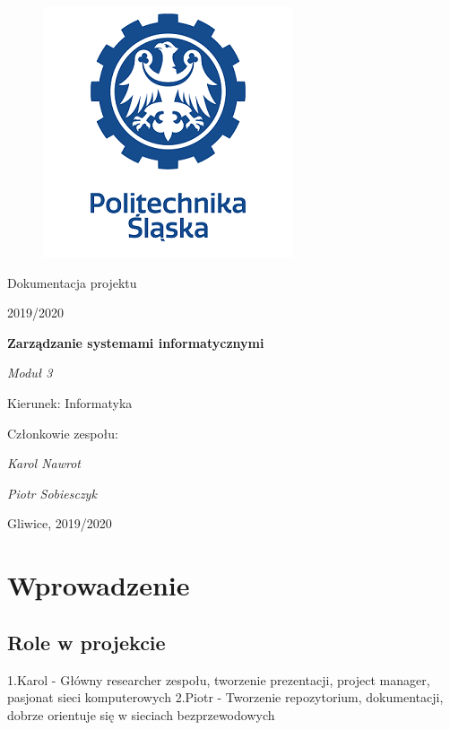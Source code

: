 \documentclass[12pt,a4paper]{article}
\begin{document}
\clearpage
\begin{figure}[h]
\centering
\includegraphics{media/ps-logo.png}
\end{figure}
\hspace{3cm}
\begin{center}Dokumentacja projektu\end{center}
\begin{center}2019/2020\end{center}
\hspace{3cm}
\begin{center}\large\textbf{Zarządzanie systemami informatycznymi}\end{center}
\begin{center}\large\textit{Moduł 3}\end{center}

\hspace{7cm}
\begin{flushright}Kierunek: Informatyka
\end{flushright}
\begin{flushright}Członkowie zespołu:
\par
\textit{Karol Nawrot}
\par
\textit{Piotr Sobiesczyk}
\end{flushright}
\vfill
\begin{center}Gliwice, 2019/2020\end{center}

\newpage
{}
\tableofcontents

\newpage
\section{Wprowadzenie}

\subsection{Role w projekcie}
1.Karol - Główny researcher zespołu, tworzenie prezentacji, project manager, pasjonat sieci komputerowych \newline
2.Piotr - Tworzenie repozytorium, dokumentacji, dobrze orientuje się w sieciach bezprzewodowych
\end{document}
